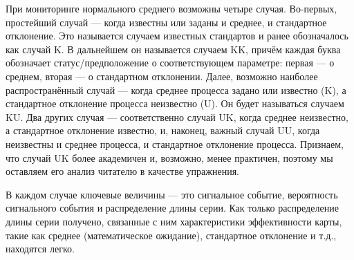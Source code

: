 При мониторинге нормального среднего возможны четыре случая. Во-первых, простейший случай — когда известны или заданы и среднее, и стандартное отклонение. Это называется случаем известных стандартов и ранее обозначалось как случай K. В дальнейшем он называется случаем KK, причём каждая буква обозначает статус/предположение о соответствующем параметре: первая — о среднем, вторая — о стандартном отклонении. Далее, возможно наиболее распространённый случай — когда среднее процесса задано или известно (K), а стандартное отклонение процесса неизвестно (U). Он будет называться случаем KU. Два других случая — соответственно случай UK, когда среднее неизвестно, а стандартное отклонение известно, и, наконец, важный случай UU, когда неизвестны и среднее процесса, и стандартное отклонение процесса. Признаем, что случай UK более академичен и, возможно, менее практичен, поэтому мы оставляем его анализ читателю в качестве упражнения.

В каждом случае ключевые величины — это сигнальное событие, вероятность сигнального события и распределение длины серии. Как только распределение длины серии получено, связанные с ним характеристики эффективности карты, такие как среднее (математическое ожидание), стандартное отклонение и т.д., находятся легко.

